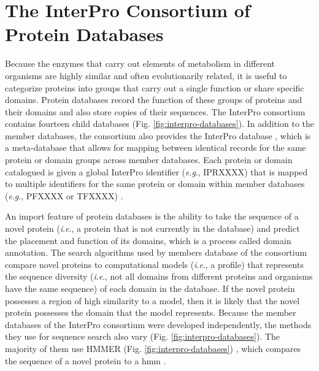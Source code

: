 \section{The InterPro Consortium of Protein Databases} \label{InterProDatabases}

Because the enzymes that carry out elements of metabolism in different organisms 
are highly similar and often evolutionarily related, it is useful to categorize 
proteins into groups that carry out a single function or share specific domains. 
Protein databases record the function of these groups of proteins and their 
domains and also store copies of their sequences. The InterPro consortium 
\cite{apweiler2000interpro,hunter2008interpro,Hunter2009} contains fourteen 
child databases \cite{finn2016interpro,Hunter2009} (Fig. 
\ref{fig:interpro-databases}). In addition to the member databases, the 
consortium also provides the InterPro database 
\cite{hunter2008interpro,finn2016interpro}, which is a meta-database that allows 
for mapping between identical records for the same protein or domain groups 
across member databases. Each protein or domain catalogued is given a global 
InterPro identifier (\textit{e}.\textit{g}., IPRXXXX) that is mapped to multiple identifiers for 
the same protein or domain within member databases (\textit{e}.\textit{g}., PFXXXX or TFXXXX) 
\cite{hunter2008interpro,finn2016interpro}.

An import feature of protein databases is the ability to take the sequence of a 
novel protein (\textit{i}.\textit{e}., a protein that is not currently in the database) and 
predict the placement and function of its domains, which is a process called 
domain annotation. The search algorithms used by members database of the 
consortium compare novel proteins to computational models (\textit{i}.\textit{e}., a profile) that 
represents the sequence diversity (\textit{i}.\textit{e}., not all domains from different proteins 
and organisms have the same sequence) of each domain in the database. If the 
novel protein possesses a region of high similarity to a model, then it is 
likely that the novel protein possesses the domain that the model represents. 
Because the member databases of the InterPro consortium were developed 
independently, the methods they use for sequence search also vary (Fig. 
\ref{fig:interpro-databases}). The majority of them use HMMER (Fig. 
\ref{fig:interpro-databases}) \cite{eddy2011accelerated}, which compares the 
sequence of a novel protein to a \gls{hmm} \cite{de2007hidden}.

